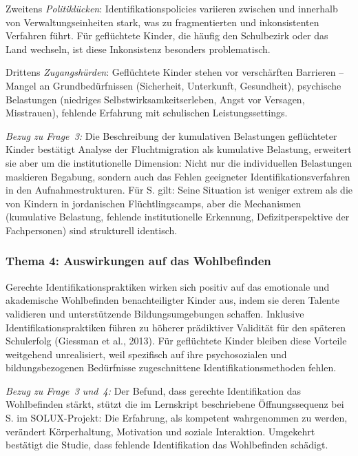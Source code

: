\documentclass[ngerman, a4paper]{article}
\begin{document}
Zweitens \textit{Politiklücken}: Identifikationspolicies variieren
zwischen und innerhalb von Verwaltungseinheiten stark, was zu
fragmentierten und inkonsistenten Verfahren führt. Für geflüchtete Kinder,
die häufig den Schulbezirk oder das Land wechseln, ist diese Inkonsistenz
besonders problematisch.

Drittens \textit{Zugangshürden}: Geflüchtete Kinder stehen vor
verschärften Barrieren -- Mangel an Grundbedürfnissen (Sicherheit,
Unterkunft, Gesundheit), psychische Belastungen (niedriges
Selbstwirksamkeitserleben, Angst vor Versagen, Misstrauen), fehlende
Erfahrung mit schulischen Leistungssettings.

\textit{Bezug zu Frage~3:} Die Beschreibung der kumulativen Belastungen
geflüchteter Kinder bestätigt \textcite[S.\,86--98]{behrensen2019inklusive} Analyse
der Fluchtmigration als kumulative Belastung, erweitert sie aber um die
institutionelle Dimension: Nicht nur die individuellen Belastungen
maskieren Begabung, sondern auch das Fehlen geeigneter
Identifikationsverfahren in den Aufnahmestrukturen. Für S. gilt: Seine
Situation ist weniger extrem als die von Kindern in jordanischen
Flüchtlingscamps, aber die Mechanismen (kumulative Belastung, fehlende
institutionelle Erkennung, Defizitperspektive der Fachpersonen) sind
strukturell identisch.

\subsubsection*{Thema 4: Auswirkungen auf das Wohlbefinden}

Gerechte Identifikationspraktiken wirken sich positiv auf das emotionale
und akademische Wohlbefinden benachteiligter Kinder aus, indem sie deren
Talente validieren und unterstützende Bildungsumgebungen schaffen. Inklusive
Identifikationspraktiken führen zu höherer prädiktiver Validität für den
späteren Schulerfolg (Giessman et al., 2013). Für geflüchtete Kinder
bleiben diese Vorteile weitgehend unrealisiert, weil spezifisch auf ihre
psychosozialen und bildungsbezogenen Bedürfnisse zugeschnittene
Identifikationsmethoden fehlen.

\textit{Bezug zu Frage~3 und~4:} Der Befund, dass gerechte Identifikation
das Wohlbefinden stärkt, stützt die im Lernskript beschriebene
Öffnungssequenz bei S. im SOLUX-Projekt: Die Erfahrung, als kompetent
wahrgenommen zu werden, verändert Körperhaltung, Motivation und soziale
Interaktion. Umgekehrt bestätigt die Studie, dass fehlende Identifikation
das Wohlbefinden schädigt.
\end{document}
